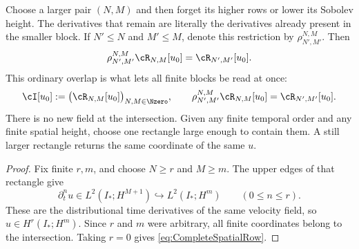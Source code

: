 Choose a larger pair \((N,M)\) and then forget its higher rows or lower its Sobolev
height.  The derivatives that remain are literally the derivatives already present in
the smaller block.  If \(N'\leq N\) and \(M'\leq M\), denote this restriction by
\(\rho_{N',M'}^{N,M}\).  Then
\begin{equation}\label{eq:BodyRectangleRestrictionCompatibility}
  \rho_{N',M'}^{N,M}\cR_{N,M}[u_0]
  =\cR_{N',M'}[u_0].
\end{equation}
This ordinary overlap is what lets all finite blocks be read at once:
\begin{equation}\label{eq:DatumSpecificCompatibleIntersection}
  \cI[u_0]
  :=\bigl(\cR_{N,M}[u_0]\bigr)_{N,M\in\Nzero},
  \qquad
  \rho_{N',M'}^{N,M}\cR_{N,M}[u_0]
  =\cR_{N',M'}[u_0].
\end{equation}
There is no new field at the intersection.  Given any finite temporal order and any
finite spatial height, choose one rectangle large enough to contain them.  A still
larger rectangle returns the same coordinate of the same \(u\).


\begin{proof}
Fix finite \(r,m\), and choose \(N\geq r\) and \(M\geq m\).  The upper edges of
that rectangle give
\[
  \partial_t^nu\in L^2(I_*;H^{M+1})
  \hookrightarrow L^2(I_*;H^m)
  \qquad(0\leq n\leq r).
\]
These are the distributional time derivatives of the same velocity field, so
\(u\in H^r(I_*;H^m)\).  Since \(r\) and \(m\) were arbitrary, all finite coordinates
belong to the intersection.  Taking \(r=0\) gives \eqref{eq:CompleteSpatialRow}.
\end{proof}
